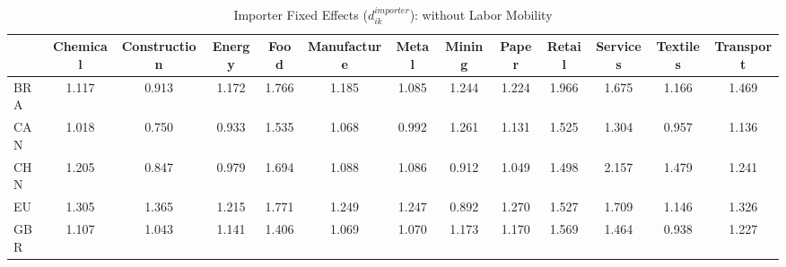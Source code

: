 \begin{table}[htbp]
\centering
\caption{Importer Fixed Effects ($d_{ik}^{importer}$): without Labor Mobility} 
\label{tab:importer_effects}
\begin{tabular}{lcccccccccccc}
  \hline
 & Chemical & Construction & Energy & Food & Manufacture & Metal & Mining & Paper & Retail & Services & Textiles & Transport \\ 
  \hline
BRA & \textcolor[RGB]{170,110,85}{1.117} & \textcolor[RGB]{236,153,19}{0.913} & \textcolor[RGB]{144,94,110}{1.172} & \textcolor[RGB]{15,10,240}{1.766} & \textcolor[RGB]{138,89,117}{1.185} & \textcolor[RGB]{185,120,70}{1.085} & \textcolor[RGB]{113,73,142}{1.244} & \textcolor[RGB]{128,82,128}{1.224} & \textcolor[RGB]{11,7,244}{1.966} & \textcolor[RGB]{21,14,234}{1.675} & \textcolor[RGB]{151,98,104}{1.166} & \textcolor[RGB]{53,34,202}{1.469} \\ 
  CAN & \textcolor[RGB]{208,135,47}{1.018} & \textcolor[RGB]{253,164,2}{0.750} & \textcolor[RGB]{230,148,26}{0.933} & \textcolor[RGB]{38,25,217}{1.535} & \textcolor[RGB]{191,124,64}{1.068} & \textcolor[RGB]{215,139,40}{0.992} & \textcolor[RGB]{102,66,153}{1.261} & \textcolor[RGB]{168,109,87}{1.131} & \textcolor[RGB]{42,27,212}{1.525} & \textcolor[RGB]{91,59,164}{1.304} & \textcolor[RGB]{225,146,30}{0.957} & \textcolor[RGB]{166,107,89}{1.136} \\ 
  CHN & \textcolor[RGB]{134,87,121}{1.205} & \textcolor[RGB]{249,161,6}{0.847} & \textcolor[RGB]{219,142,36}{0.979} & \textcolor[RGB]{19,12,236}{1.694} & \textcolor[RGB]{181,117,74}{1.088} & \textcolor[RGB]{183,118,72}{1.086} & \textcolor[RGB]{238,154,17}{0.912} & \textcolor[RGB]{202,131,53}{1.049} & \textcolor[RGB]{47,30,208}{1.498} & \textcolor[RGB]{2,1,253}{2.157} & \textcolor[RGB]{51,33,204}{1.479} & \textcolor[RGB]{115,74,140}{1.241} \\ 
  EU & \textcolor[RGB]{89,58,166}{1.305} & \textcolor[RGB]{77,50,178}{1.365} & \textcolor[RGB]{132,85,123}{1.215} & \textcolor[RGB]{13,8,242}{1.771} & \textcolor[RGB]{106,69,149}{1.249} & \textcolor[RGB]{110,72,144}{1.247} & \textcolor[RGB]{242,157,13}{0.892} & \textcolor[RGB]{98,63,157}{1.270} & \textcolor[RGB]{40,26,215}{1.527} & \textcolor[RGB]{17,11,238}{1.709} & \textcolor[RGB]{159,103,96}{1.146} & \textcolor[RGB]{83,54,172}{1.326} \\ 
  GBR & \textcolor[RGB]{174,113,81}{1.107} & \textcolor[RGB]{204,132,51}{1.043} & \textcolor[RGB]{162,104,94}{1.141} & \textcolor[RGB]{70,45,185}{1.406} & \textcolor[RGB]{189,122,66}{1.069} & \textcolor[RGB]{187,121,68}{1.070} & \textcolor[RGB]{142,92,113}{1.173} & \textcolor[RGB]{147,95,108}{1.170} & \textcolor[RGB]{34,22,221}{1.569} & \textcolor[RGB]{57,37,198}{1.464} & \textcolor[RGB]{227,147,28}{0.938} & \textcolor[RGB]{125,81,130}{1.227} \\ 

\end{tabular}
\end{table}
